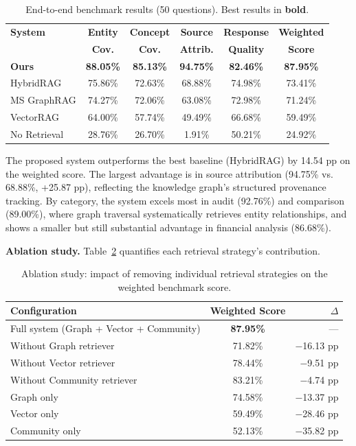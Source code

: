 \documentclass[review]{elsarticle}
\begin{document}
\begin{table}[t]
\caption{End-to-end benchmark results (50 questions). Best results in \textbf{bold}.}
\label{tab:benchmark}
\centering
\small
\begin{tabular}{@{}lccccc@{}}
\toprule
\textbf{System} & \textbf{Entity} & \textbf{Concept} & \textbf{Source} & \textbf{Response} & \textbf{Weighted} \\
& \textbf{Cov.} & \textbf{Cov.} & \textbf{Attrib.} & \textbf{Quality} & \textbf{Score} \\
\midrule
\textbf{Ours} & \textbf{88.05\%} & \textbf{85.13\%} & \textbf{94.75\%} & \textbf{82.46\%} & \textbf{87.95\%} \\
HybridRAG & 75.86\% & 72.63\% & 68.88\% & 74.98\% & 73.41\% \\
MS GraphRAG & 74.27\% & 72.06\% & 63.08\% & 72.98\% & 71.24\% \\
VectorRAG & 64.00\% & 57.74\% & 49.49\% & 66.68\% & 59.49\% \\
No Retrieval & 28.76\% & 26.70\% & 1.91\% & 50.21\% & 24.92\% \\
\bottomrule
\end{tabular}
\end{table}

The proposed system outperforms the best baseline (HybridRAG) by 14.54 pp on the weighted score. The largest advantage is in source attribution (94.75\% vs. 68.88\%, +25.87 pp), reflecting the knowledge graph's structured provenance tracking. By category, the system excels most in audit (92.76\%) and comparison (89.00\%), where graph traversal systematically retrieves entity relationships, and shows a smaller but still substantial advantage in financial analysis (86.68\%).

\textbf{Ablation study.} Table~\ref{tab:ablation} quantifies each retrieval strategy's contribution.

\begin{table}[t]
\caption{Ablation study: impact of removing individual retrieval strategies on the weighted benchmark score.}
\label{tab:ablation}
\centering
\begin{tabular}{@{}lcr@{}}
\toprule
\textbf{Configuration} & \textbf{Weighted Score} & \textbf{$\Delta$} \\
\midrule
Full system (Graph + Vector + Community) & \textbf{87.95\%} & --- \\
Without Graph retriever & 71.82\% & $-$16.13 pp \\
Without Vector retriever & 78.44\% & $-$9.51 pp \\
Without Community retriever & 83.21\% & $-$4.74 pp \\
\midrule
Graph only & 74.58\% & $-$13.37 pp \\
Vector only & 59.49\% & $-$28.46 pp \\
Community only & 52.13\% & $-$35.82 pp \\
\bottomrule
\end{tabular}
\end{table}
\end{document}
